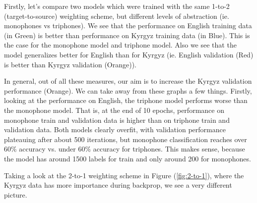 \documentclass[a4paper]{article}
\begin{document}
Firstly, let's compare two models which were trained with the same 1-to-2 (target-to-source) weighting scheme, but different levels of abstraction (ie. monophones vs triphones). We see that the performance on English training data (in Green) is better than performance on Kyrgyz training data (in Blue). This is the case for the monophone model and triphone model. Also we see that the model generalizes better for English than for Kyrgyz (ie. English validation (Red) is better than Kyrgyz validation (Orange)).

In general, out of all these measures, our aim is to increase the Kyrgyz validation performance (Orange). We can take away from these graphs a few things. Firstly, looking at the performance on English, the triphone model performs worse than the monophone model. That is, at the end of 10 epochs, performance on monophone train and validation data is higher than on triphone train and validation data. Both models clearly overfit, with validation performance plateauing after about 500 iterations, but monophone classification reaches over 60\% accuracy vs. under 60\% accuracy for triphones. This makes sense, because the model has around 1500 labels for train and only around 200 for monophones.




Taking a look at the 2-to-1 weighting scheme in Figure (\ref{fig:2-to-1}), where the Kyrgyz data has more importance during backprop, we see a very different picture.
\end{document}
